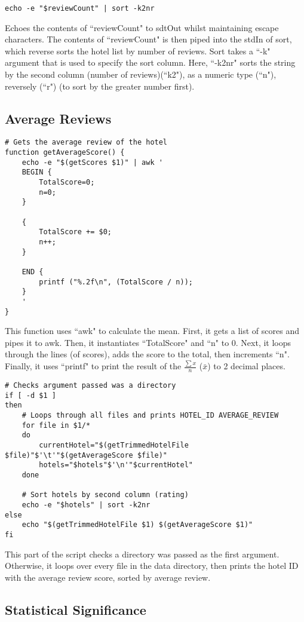 \documentclass[a4paper]{article}
\begin{document}
\begin{lstlisting}
echo -e "$reviewCount" | sort -k2nr
\end{lstlisting}
Echoes the contents of ``reviewCount" to sdtOut whilst maintaining escape characters.
The contents of ``reviewCount" is then piped into the stdIn of sort, which reverse sorts the hotel list by number of reviews.
Sort takes a ``-k" argument that is used to specify the sort column.
Here, ``-k2nr" sorts the string by the second column (number of reviews)(``k2"), as a numeric type (``n"), reversely (``r") (to sort by the greater number first).

%
\newpage
\subsection{Average Reviews}
\begin{lstlisting}
# Gets the average review of the hotel
function getAverageScore() {
	echo -e "$(getScores $1)" | awk '
	BEGIN {
		TotalScore=0;
		n=0;
	}

	{
		TotalScore += $0;
		n++;
	}

	END {
		printf ("%.2f\n", (TotalScore / n));
	}
	'
}
\end{lstlisting}
This function uses ``awk" to calculate the mean.
First, it gets a list of scores and pipes it to awk.
Then, it instantiates ``TotalScore" and ``n" to 0.
Next, it loops through the lines (of scores), adds the score to the total, then increments ``n".
Finally, it uses ``printf" to print the result of the $\frac{\sum{x}}{n}$ ($\bar{x}$) to 2 decimal places.


\begin{lstlisting}
# Checks argument passed was a directory
if [ -d $1 ]
then
	# Loops through all files and prints HOTEL_ID AVERAGE_REVIEW
	for file in $1/*
	do
		currentHotel="$(getTrimmedHotelFile $file)"$'\t'"$(getAverageScore $file)"
		hotels="$hotels"$'\n'"$currentHotel"
	done
	
	# Sort hotels by second column (rating)
	echo -e "$hotels" | sort -k2nr
else
	echo "$(getTrimmedHotelFile $1) $(getAverageScore $1)"
fi
\end{lstlisting}
This part of the script checks a directory was passed as the first argument.
Otherwise, it loops over every file in the data directory, then prints the hotel ID with the average review score, sorted by average review.

%
\newpage
\subsection{Statistical Significance}
\end{document}
